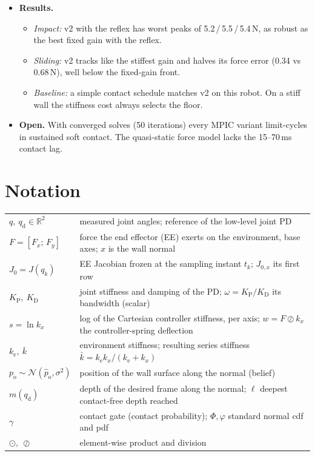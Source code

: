 \documentclass[11pt,a4paper]{article}
\newcommand{\kb}{\bar{k}}
\newcommand{\qd}{q_{\mathrm{d}}}
\newcommand{\phat}{\hat{p}_{\mathrm{o}}}
\newcommand{\ke}{k_{\mathrm{e}}}
\newcommand{\kx}{k_{x}}
\begin{document}
\begin{tcolorbox}[summarybox,title=Summary]
\begin{itemize}[leftmargin=12pt]
  during the impact (hold 0.2\,s, then at most 3\,1/s), a contact-aware stiffness floor, the force risk
  only in contact, and a force-state reset. A \SI{1}{kHz} contact reflex in the low-level loop helps
  every controller.
\item \textbf{Results.}
  \begin{itemize}[leftmargin=10pt]
  \item \emph{Impact:} v2 with the reflex has worst peaks of 5.2\,/\,5.5\,/\,5.4\,N, as robust as the
    best fixed gain with the reflex.
  \item \emph{Sliding:} v2 tracks like the stiffest gain and halves its force error (0.34 vs
    0.68\,N), well below the fixed-gain front.
  \item \emph{Baseline:} a simple contact schedule matches v2 on this robot. On a stiff wall the
    stiffness cost always selects the floor.
  \end{itemize}
\item \textbf{Open.} With converged solves (50 iterations) every MPIC variant limit-cycles in
  sustained soft contact. The quasi-static force model lacks the 15--70\,ms contact lag.
\end{itemize}
\end{tcolorbox}

\tableofcontents

\section*{Notation}
\begin{tabularx}{\linewidth}{@{}lX@{}}
$q,\ \qd\in\mathbb{R}^2$ & measured joint angles; reference of the low-level joint PD \\
$F=[F_x;\,F_y]$ & force the end effector (EE) exerts on the environment, base axes; $x$ is the wall normal \\
$J_0=J(q_k)$ & EE Jacobian frozen at the sampling instant $t_k$; $J_{0,x}$ its first row \\
$K_\mathrm{P},\ K_\mathrm{D}$ & joint stiffness and damping of the PD; $\omega=K_\mathrm{P}/K_\mathrm{D}$ its bandwidth (scalar) \\
$s=\ln \kx$ & log of the Cartesian controller stiffness, per axis; $w=F\oslash \kx$ the controller-spring deflection \\
$\ke,\ \kb$ & environment stiffness; resulting series stiffness $\kb=\ke\kx/(\ke+\kx)$ \\
$p_\mathrm{o}\sim\mathcal{N}(\phat,\sigma^2)$ & position of the wall surface along the normal (belief) \\
$m(\qd)$ & depth of the desired frame along the normal; $\ell$ deepest contact-free depth reached \\
$\gamma$ & contact gate (contact probability); $\Phi,\varphi$ standard normal cdf and pdf \\
$\odot,\ \oslash$ & element-wise product and division
\end{tabularx}
\end{document}
